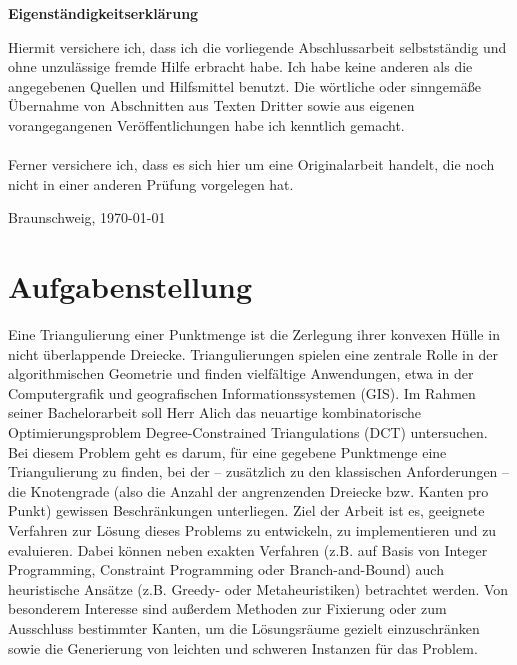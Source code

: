 \documentclass[11pt,a4paper,twoside,titlepage]{scrbook}
\theoremstyle{plain}%
\theoremstyle{remark}%
\theoremstyle{definition}%
\begin{document}
	\cleardoublepage

	\thispagestyle{plain} %
	\vspace*{7cm}
	\centerline{\bfseries Eigenständigkeitserklärung}
	\vspace*{1em}
	\noindent
	Hiermit versichere ich, dass ich die vorliegende Abschlussarbeit
selbstständig und ohne unzulässige fremde Hilfe erbracht habe. Ich habe
keine anderen als die angegebenen Quellen und Hilfsmittel benutzt. Die
wörtliche oder sinngemäße Übernahme von Abschnitten aus Texten
Dritter sowie aus eigenen vorangegangenen Veröffentlichungen habe ich
kenntlich gemacht.
\\ \\Ferner versichere ich, dass es sich hier um eine Originalarbeit handelt,
die noch nicht in einer anderen Prüfung vorgelegen hat.

	\par
	\bigskip\noindent Braunschweig, \today \par
	\vspace*{10mm}
	\hfill\hrulefill
	\cleardoublepage


	\chapter*{Aufgabenstellung}
	Eine Triangulierung einer Punktmenge ist die Zerlegung ihrer konvexen Hülle in nicht überlappende Dreiecke. Triangulierungen spielen eine zentrale Rolle in der algorithmischen Geometrie und finden vielfältige Anwendungen, etwa in der Computergrafik und geografischen Informationssystemen (GIS). Im Rahmen seiner Bachelorarbeit soll Herr Alich das neuartige kombinatorische Optimierungsproblem Degree-Constrained Triangulations (DCT) untersuchen. Bei diesem Problem geht es darum, für eine gegebene Punktmenge eine Triangulierung zu finden, bei der – zusätzlich zu den klassischen Anforderungen – die Knotengrade (also die Anzahl der angrenzenden Dreiecke bzw. Kanten pro Punkt) gewissen Beschränkungen unterliegen. Ziel der Arbeit ist es, geeignete Verfahren zur Lösung dieses Problems zu entwickeln, zu implementieren und zu evaluieren. Dabei können neben exakten Verfahren (z.B. auf Basis von Integer Programming, Constraint Programming oder Branch-and-Bound) auch heuristische Ansätze (z.B. Greedy- oder Metaheuristiken) betrachtet werden. Von besonderem Interesse sind außerdem Methoden zur Fixierung oder zum Ausschluss bestimmter Kanten, um die Lösungsräume gezielt einzuschränken sowie die Generierung von leichten und schweren Instanzen für das Problem.
    
\end{document}
